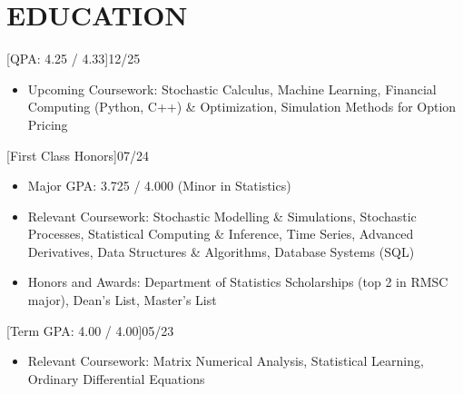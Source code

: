 \documentclass[cmu]{resume}
\begin{document}
    \address{160 Water Street, New York, NY 10038}
    \maketitle
    \section{EDUCATION}
    [QPA: 4.25 / 4.33]{12/25}
    \begin{itemize}
        \item Upcoming Coursework: Stochastic Calculus, Machine Learning, Financial Computing (Python, C++) \& Optimization, Simulation Methods for Option Pricing
    \end{itemize}

    [First Class Honors]{07/24}
    \begin{itemize}
        \item Major GPA: 3.725 / 4.000 (Minor in Statistics)
        \item Relevant Coursework: Stochastic Modelling \& Simulations, Stochastic Processes, Statistical Computing \& Inference, Time Series, Advanced Derivatives, Data Structures \& Algorithms, Database Systems (SQL)
        \item Honors and Awards: Department of Statistics Scholarships (top 2 in RMSC major), Dean's List, Master's List
    \end{itemize}

    [Term GPA: 4.00 / 4.00]{05/23}
    \begin{itemize}
        \item Relevant Coursework: Matrix Numerical Analysis, Statistical Learning, Ordinary Differential Equations
    \end{itemize}
\end{document}
